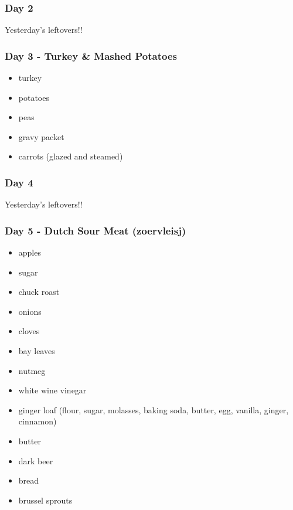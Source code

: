 \documentclass[11pt, a4paper]{article}
\begin{document}
\subsubsection{Day 2}
\vspace{1pc}
Yesterday's leftovers!!

\subsubsection{Day 3 - Turkey \& Mashed Potatoes}
\vspace{1pc}
\begin{itemize}
\item turkey
\item potatoes
\item peas
\item gravy packet
\item carrots (glazed and steamed)
\end{itemize}

\subsubsection{Day 4}
\vspace{1pc}
Yesterday's leftovers!!

\subsubsection{Day 5 - Dutch Sour Meat (zoervleisj)} 
\vspace{1pc}
\begin{itemize}
\item apples
\item sugar 
\item chuck roast
\item onions 
\item cloves 
\item bay leaves 
\item nutmeg 
\item white wine vinegar 
\item ginger loaf (flour, sugar, molasses, baking soda, butter, egg, vanilla, ginger, cinnamon) 
\item butter 
\item dark beer 
\item bread 
\item brussel sprouts 
\end{itemize}
\end{document}
